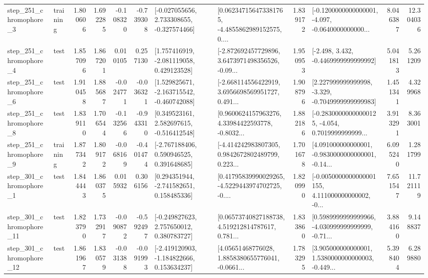 \begin{tabular}{llrrrrllrlrr}
   step\_251\_chromophore\_3 &  training &      1.800606 &    1.692285 &     -0.108320 & -0.739308 &   [-0.027055656, 2.733308655, -0.327574466] &  [0.062347156473381765, -4.4855862989152575, 0.... &       1.839172 &  [-0.1200000000000001, -4.097, -0.0640000000000... &            8.046387 &         12.304036 \\
   step\_251\_chromophore\_4 &      test &      1.857096 &    1.867201 &      0.010105 &  0.257130 &    [1.757416919, -2.081119058, 0.429123528] &  [-2.872692457729896, 3.6473971498356526, -0.09... &       1.950953 &               [-2.498, 3.432, -0.4469999999999992] &            5.041813 &          5.261209 \\
   step\_251\_chromophore\_6 &      test &      1.910458 &    1.885687 &     -0.024771 & -0.036321 &   [1.529825671, -2.163715542, -0.460742088] &  [-2.668114556422919, 3.6956698569951727, 0.491... &       1.908796 &   [2.227999999999998, -3.329, -0.7049999999999983] &            1.451341 &          4.329968 \\
   step\_251\_chromophore\_8 &      test &      1.839110 &    1.706544 &     -0.132566 & -0.943310 &    [0.349523161, 2.582697615, -0.516412548] &  [0.9600624157963276, 4.33984422593778, -0.8032... &       1.882186 &  [-0.28300000000000125, -4.054, 0.7019999999999... &            3.913291 &          8.363001 \\
   step\_251\_chromophore\_9 &  training &      1.877342 &    1.809172 &     -0.068169 & -0.401474 &    [-2.767188406, 0.590946525, 0.391648685] &  [-4.414242983807305, 0.9842672802489799, 0.223... &       1.701678 &  [4.091000000000001, -0.9830000000000001, -0.14... &            6.095240 &          1.281799 \\
   step\_301\_chromophore\_1 &      test &      1.844443 &    1.860375 &      0.015932 &  0.306156 &    [0.294351944, -2.741582651, 0.158485336] &  [0.41795839990029265, -4.5229443974702725, -0.... &       1.820990 &  [-0.0050000000000001155, 4.111000000000002, -0... &            7.651547 &         11.721119 \\
  step\_301\_chromophore\_11 &      test &      1.823790 &    1.732917 &     -0.090872 & -0.592497 &    [-0.249827623, 2.757650012, 0.380783727] &  [0.06573740827188738, 4.519212814787617, 0.781... &       1.833860 &  [0.5989999999999966, -4.030999999999999, -0.71... &            3.884160 &          9.148837 \\
  step\_301\_chromophore\_12 &      test &      1.861967 &    1.830579 &     -0.031388 & -0.091993 &   [-2.419120903, -1.184822666, 0.153634237] &  [4.05651468776028, 1.8858380655776041, -0.0661... &       1.783295 &  [3.905000000000001, 1.5380000000000003, -0.449... &            5.398404 &          6.289880 \\

\end{tabular}
